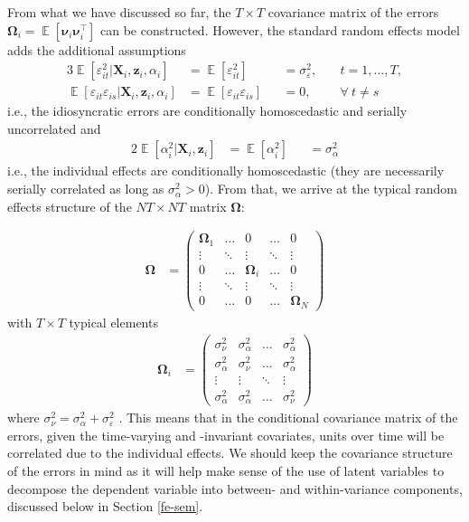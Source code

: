 \documentclass[]{interact}
\theoremstyle{plain}%
\theoremstyle{definition}
\theoremstyle{remark}
\begin{document}
From what we have discussed so far, the \(T \times T\) covariance matrix
of the errors
\(\bm{\Omega}_{i} = \mathop{\mathrm{\mathbb{E}}}[\bm{\nu}_{i}\bm{\nu}_{i}^{\intercal}]\)
can be constructed. However, the standard random effects model adds the
additional assumptions \begin{alignat}{3}
\mathop{\mathrm{\mathbb{E}}}[\varepsilon_{it}^{2} | \bm{X}_{i}, \bm{z}_{i}, \alpha_{i}] & = \mathop{\mathrm{\mathbb{E}}}[\varepsilon_{it}^{2}] && = \sigma_{\varepsilon}^{2}, && \ t = 1, ..., T, \\
\mathop{\mathrm{\mathbb{E}}}[\varepsilon_{it}\varepsilon_{is}| \bm{X}_{i}, \bm{z}_{i}, \alpha_{i}] & = \mathop{\mathrm{\mathbb{E}}}[\varepsilon_{it}\varepsilon_{is}] && = 0, && \ \forall \ t \ne s 
\end{alignat} i.e., the idiosyncratic errors are conditionally
homoscedastic and serially uncorrelated and \begin{alignat}{2}
\mathop{\mathrm{\mathbb{E}}}[\alpha_{i}^{2}| \bm{X}_{i},\bm{z}_{i}] & = \mathop{\mathrm{\mathbb{E}}}[\alpha_{i}^{2}] && = \sigma^{2}_{\alpha}
\end{alignat} i.e., the individual effects are conditionally
homoscedastic (they are necessarily serially correlated as long as
\(\sigma_{\alpha}^{2} > 0\)). From that, we arrive at the typical random
effects structure of the \(NT \times NT\) matrix \(\bm{\Omega}\):

\begin{align}
\bm{\Omega} & = 
\begin{pmatrix}
\bm{\Omega}_{1} & \hdots & 0 & \hdots & 0 \\
\vdots & \ddots & \vdots & \ddots & \vdots \\
0 & \hdots & \bm{\Omega}_{i} & \hdots & 0 \\
\vdots & \ddots & \vdots & \ddots & \vdots \\
0 & \hdots & 0 & \hdots & \bm{\Omega}_{N}
\end{pmatrix}
\end{align} with \(T \times T\) typical elements \begin{align}
\bm{\Omega}_{i} & = 
\begin{pmatrix}
\sigma^{2}_{\nu} & \sigma^{2}_{\alpha} & \hdots & \sigma^{2}_{\alpha} \\
\sigma^{2}_{\alpha} & \sigma^{2}_{\nu} & \hdots & \sigma^{2}_{\alpha} \\
\vdots & \vdots & \ddots & \vdots \\
\sigma^{2}_{\alpha} & \sigma^{2}_{\alpha} & \hdots & \sigma^{2}_{\nu}
\end{pmatrix} \label{eq:omeganui}
\end{align} where
\(\sigma^{2}_{\nu} = \sigma^{2}_{\alpha} + \sigma^{2}_{\varepsilon}\)
\citep{Wooldridge2002, Schmidheiny2019}. This means that in the
conditional covariance matrix of the errors, given the time-varying and
-invariant covariates, units over time will be correlated due to the
individual effects. We should keep the covariance structure of the
errors in mind as it will help make sense of the use of latent variables
to decompose the dependent variable into between- and within-variance
components, discussed below in Section \ref{fe-sem}.
\end{document}
